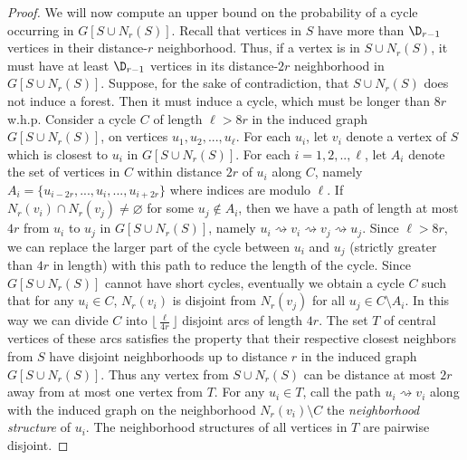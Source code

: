 \documentclass[12pt,a4paper]{article}
\def\sm{\setminus}
\def\Dr{\D_{r-1}}
\theoremstyle{plain}
\begin{document}
\begin{proof}
	We will now compute an upper bound on the probability of a cycle occurring in $G[S\cup N_r(S)]$. Recall that vertices in $S$ have more than $\Dr$ vertices in their distance-$r$ neighborhood. Thus, if a vertex is in $S \cup N_r(S)$, it must have at least $\Dr$ vertices in its distance-$2r$ neighborhood in $G[S\cup N_r(S)]$. Suppose, for the sake of contradiction, that $S \cup N_r(S)$ does not induce a forest. Then it must induce a cycle, which must be longer than $8r$ w.h.p. Consider a cycle $C$ of length $\ell > 8r$ in the induced graph $G[S\cup N_r(S)]$, on vertices $u_1, u_2,...,u_\ell$. For each $u_i$, let $v_i$ denote a vertex of $S$ which is closest to $u_i$ in $G[S\cup N_r(S)]$. For each $i=1,2,..,\ell$, let $A_i$ denote the set of vertices in $C$ within distance $2r$ of $u_i$ along $C$, namely $A_i = \{u_{i-2r},...,u_i,...,u_{i+2r}\}$ where indices are modulo $\ell$. If $N_r(v_i) \cap N_r(v_j) \neq \varnothing$ for some $u_j\notin A_i$, then we have a path of length at most $4r$ from $u_i$ to $u_j$ in $G[S\cup N _r(S)]$, namely $u_i\rightsquigarrow v_i \rightsquigarrow v_j \rightsquigarrow u_j$. Since $\ell > 8r$, we can replace the larger part of the cycle between $u_i$ and $u_j$ (strictly greater than $4r$ in length) with this path to reduce the length of the cycle. Since $G[S\cup N_r(S)]$ cannot have short cycles, eventually we obtain a cycle $C$ such that for any $u_i \in C$, $N_r(v_i)$ is disjoint from $N_r(v_j)$ for all $u_j \in C\sm A_i$. In this way we can divide $C$ into $\lfloor \frac{\ell}{4r}\rfloor$ disjoint arcs of length $4r$. The set $T$ of central vertices of these arcs satisfies the property that their respective closest neighbors from $S$ have disjoint neighborhoods up to distance $r$ in the induced graph $G[S\cup N_r(S)]$. Thus any vertex from $S\cup N_r(S)$ can be distance at most $2r$ away from at most one vertex from $T$. For any $u_i\in T$, call the path $u_i\rightsquigarrow v_i$ along with the induced graph on the neighborhood $N_r(v_i) \sm C$ the {\em neighborhood structure} of $u_i$. The neighborhood structures of all vertices in $T$ are pairwise disjoint. 
		

\end{proof}
\end{document}
